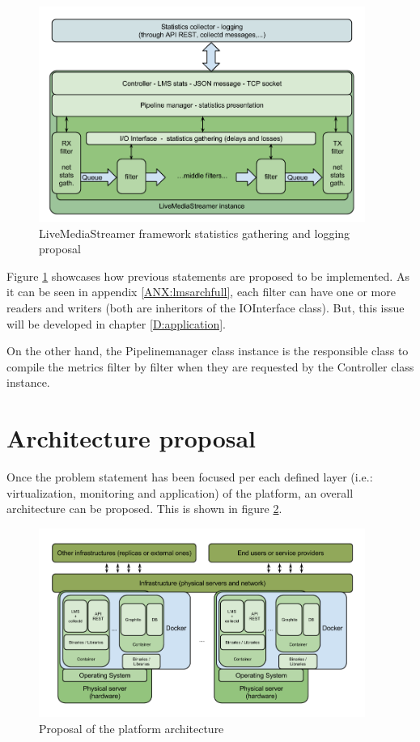 \begin{figure}[htb]
\begin{center}
\includegraphics[width=0.95\textwidth]{./images/appArch.png}
\caption{LiveMediaStreamer framework statistics gathering and logging proposal}
\label{F:appArch}
\end{center}
\end{figure}

Figure \ref{F:appArch} showcases how previous statements are proposed to be implemented. As it can be seen in appendix \ref{ANX:lmsarchfull}, each filter can have one or more readers and writers (both are inheritors of the IOInterface class). But, this issue will be developed in chapter \ref{D:application}.

On the other hand, the Pipelinemanager class instance is the responsible class to compile the metrics filter by filter when they are requested by the Controller class instance. 

\section{Architecture proposal}

Once the problem statement has been focused per each defined layer (i.e.: virtualization, monitoring and application) of the platform, an overall architecture can be proposed. This is shown in figure \ref{F:overallArchProp}.

\begin{figure}[!htb]
\begin{center}
\includegraphics[width=0.95\textwidth]{./images/overallArchProp.png}
\caption{Proposal of the platform architecture}
\label{F:overallArchProp}
\end{center}
\end{figure}

